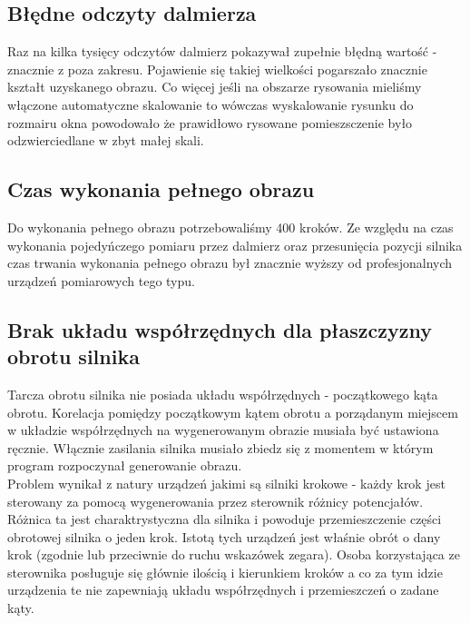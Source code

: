 \subsection {Błędne odczyty dalmierza}
Raz na kilka tysięcy odczytów dalmierz pokazywał zupełnie błędną wartość - znacznie z poza zakresu. Pojawienie się takiej wielkości pogarszało znacznie kształt uzyskanego obrazu. Co więcej jeśli na obszarze rysowania mieliśmy włączone automatyczne skalowanie to wówczas wyskalowanie rysunku do rozmairu okna powodowało że prawidłowo rysowane pomieszsczenie było odzwierciedlane w zbyt małej skali.

\subsection {Czas wykonania pełnego obrazu}
Do wykonania pełnego obrazu potrzebowaliśmy 400 kroków. Ze względu na czas wykonania pojedyńczego pomiaru przez dalmierz oraz przesunięcia pozycji silnika czas trwania wykonania pełnego obrazu był znacznie wyższy od profesjonalnych urządzeń pomiarowych tego typu.

\subsection {Brak układu współrzędnych dla płaszczyzny obrotu silnika}
Tarcza obrotu silnika nie posiada układu współrzędnych - początkowego kąta obrotu. Korelacja pomiędzy początkowym kątem obrotu a porządanym miejscem w układzie współrzędnych na wygenerowanym obrazie musiała być ustawiona ręcznie. Włącznie zasilania silnika musiało zbiedz się z momentem w którym program rozpoczynał generowanie obrazu.\\

Problem wynikał z natury urządzeń jakimi są silniki krokowe - każdy krok jest sterowany za pomocą wygenerowania przez sterownik różnicy potencjałów. Różnica ta jest charaktrystyczna dla silnika i powoduje przemieszczenie części obrotowej silnika o jeden krok. Istotą tych urządzeń jest właśnie obrót o dany krok (zgodnie lub przeciwnie do ruchu wskazówek zegara). Osoba korzystająca ze sterownika posługuje się głównie ilością i kierunkiem kroków a co za tym idzie urządzenia te nie zapewniają układu współrzędnych i przemieszczeń o zadane kąty.